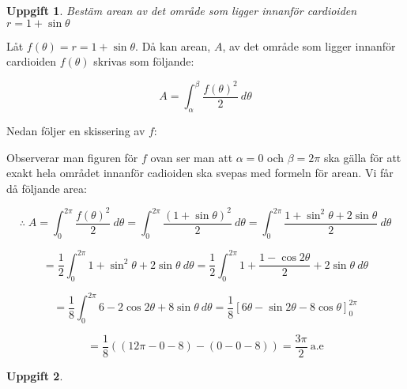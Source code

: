 \documentclass{article}
\newtheorem{thr}{Uppgift}
\begin{document}


\begin{thr}
Bestäm arean av det område som ligger innanför cardioiden $r=1+\sin\theta$
\end{thr}

Låt $f(\theta)=r=1+\sin\theta$. Då kan arean, $A$, av det område som ligger innanför cardioiden $f(\theta)$ skrivas som följande:

$$
A=
\int_{\alpha}^{\beta} \frac{f(\theta)^2}{2} \: d\theta
$$

\vskip 0.2cm

Nedan följer en skissering av $f$:

\begin{figure}[h]
    \center
\end{figure}

Observerar man figuren för $f$ ovan ser man att $\alpha=0$ och $\beta=2\pi$ ska gälla för att exakt hela området innanför cadioiden ska svepas med formeln för arean. Vi får då följande area:

$$
\therefore 
\;
A=
\int_{0}^{2\pi} \frac{f(\theta)^2}{2} \: d\theta
=
\int_{0}^{2\pi} \frac{(1+\sin\theta)^2}{2} \: d\theta
=
\int_{0}^{2\pi} \frac{1+\sin^2 \theta+2\sin\theta}{2} \: d\theta
$$

$$
=
\frac{1}{2}
\int_{0}^{2\pi} 1+\sin^2 \theta+2\sin\theta \: d\theta
=
\frac{1}{2}
\int_{0}^{2\pi} 1+\frac{1-\cos 2\theta}{2}+2\sin\theta \: d\theta
$$

$$
=
\frac{1}{8}
\int_{0}^{2\pi} 6-2\cos 2\theta+8\sin\theta \: d\theta
=
\frac{1}{8}
\left[6\theta-\sin2\theta-8\cos\theta \right]_{0}^{2\pi}
$$

$$
=
\frac{1}{8}
((12\pi-0-8)-(0-0-8))
= 
\frac{3\pi}{2} \: \text{a.e}
$$

\newpage

\begin{thr}
\end{thr}
\end{document}
